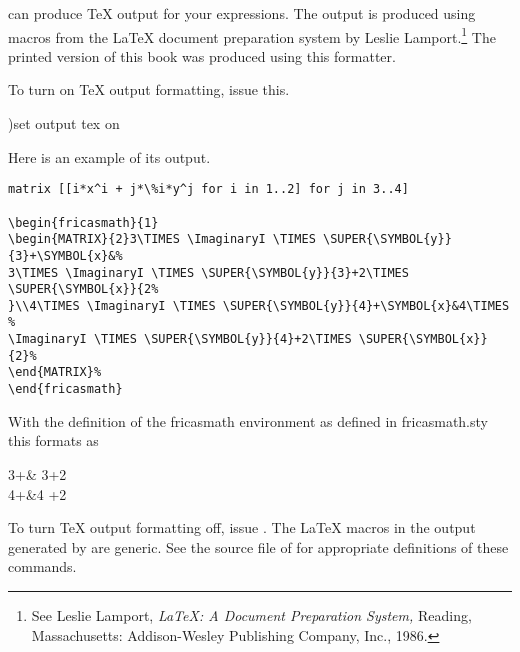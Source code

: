 
\Language{} can produce \TeX{} output for your
expressions.
The output is produced using macros from the
\LaTeX{} document preparation system by
Leslie Lamport.\footnote{See Leslie Lamport, {\it LaTeX: A Document
Preparation System,} Reading, Massachusetts: Addison-Wesley
Publishing Company, Inc., 1986.}
The printed version of this book was produced using this formatter.

\begin{noOutputXtc}
\begin{xtccomment}
To turn on \TeX{} output formatting, issue this.
\end{xtccomment}
\begin{spadsrc}
)set output tex on 
\end{spadsrc}
\end{noOutputXtc}
Here is an example of its output.
\begin{verbatim}
matrix [[i*x^i + j*\%i*y^j for i in 1..2] for j in 3..4]

\begin{fricasmath}{1}
\begin{MATRIX}{2}3\TIMES \ImaginaryI \TIMES \SUPER{\SYMBOL{y}}{3}+\SYMBOL{x}&%
3\TIMES \ImaginaryI \TIMES \SUPER{\SYMBOL{y}}{3}+2\TIMES \SUPER{\SYMBOL{x}}{2%
}\\4\TIMES \ImaginaryI \TIMES \SUPER{\SYMBOL{y}}{4}+\SYMBOL{x}&4\TIMES %
\ImaginaryI \TIMES \SUPER{\SYMBOL{y}}{4}+2\TIMES \SUPER{\SYMBOL{x}}{2}%
\end{MATRIX}%
\end{fricasmath}
\end{verbatim}
With the definition of the fricasmath environment as defined in
fricasmath.sty this formats as
\begin{fricasmath}{1}
\begin{MATRIX}{2}
3\TIMES \ImaginaryI \TIMES {}+&%
3\TIMES \ImaginaryI \TIMES {}+2\TIMES {}\\4\TIMES \ImaginaryI \TIMES {}+&4\TIMES %
\ImaginaryI \TIMES {}+2\TIMES {}%
\end{MATRIX}%
\end{fricasmath}
To turn \TeX{} output formatting off, issue
.
The \LaTeX{} macros in the output generated by \Language{}
are generic. See the source file of  for
appropriate definitions of these commands.

